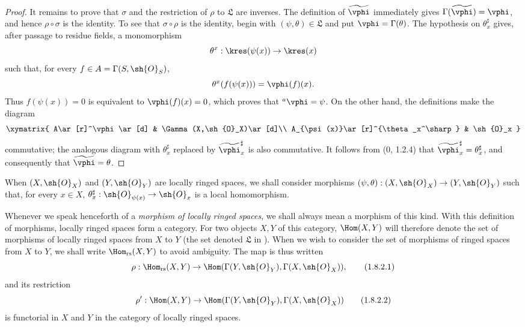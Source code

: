 \begin{proof}
It remains to prove that $\sigma$ and the restriction of $\rho$ to
$\mathfrak{L}$ are inverses.  The definition of
$\widetilde{\vphi}$ immediately gives
$\Gamma(\widetilde{\vphi})=\vphi$, and hence
$\rho\circ\sigma$ is the identity.  To see that $\sigma\circ\rho$ is
the identity, begin with $(\psi,\theta)\in\mathfrak{L}$ and put
$\vphi=\Gamma(\theta)$.  The hypothesis on $\theta_x^\sharp$ gives,
after passage to residue fields, a monomorphism
\[
  \theta^x:\kres(\psi(x))\to\kres(x)
\]
such that, for every $f\in A=\Gamma(S,\sh{O}_S)$,
\[
  \theta^x(f(\psi(x)))=\vphi(f)(x).
\]
Thus $f(\psi(x))=0$ is equivalent to $\vphi(f)(x)=0$, which proves
that ${}^a\vphi=\psi$.  On the other hand, the definitions make the
diagram
\[
  \xymatrix{
    A\ar[r]^\vphi\ar[d] &
    \Gamma(X,\sh{O}_X)\ar[d]\\
    A_{\psi(x)}\ar[r]^{\theta_x^\sharp} &
    \sh{O}_x
  }
\]
commutative; the analogous diagram with $\theta_x^\sharp$ replaced
by $\widetilde{\vphi}_x^\sharp$ is also commutative.  It follows from
(0, 1.2.4) that
$\widetilde{\vphi}_x^\sharp=\theta_x^\sharp$, and consequently that
$\widetilde{\vphi}=\theta$.
\end{proof}

\begin{env}[1.8.2]
\label{ega2:addendum:I.1.8.2}
When $(X,\sh{O}_X)$ and $(Y,\sh{O}_Y)$ are locally ringed spaces, we
shall consider morphisms
$(\psi,\theta):(X,\sh{O}_X)\to(Y,\sh{O}_Y)$ such that, for every
$x\in X$, $\theta_x^\sharp:\sh{O}_{\psi(x)}\to\sh{O}_x$ is a local
homomorphism.

Whenever we speak henceforth of a \emph{morphism of locally ringed
spaces}, we shall always mean a morphism of this kind.  With this
definition of morphisms, locally ringed spaces form a category.  For
two objects $X,Y$ of this category, $\Hom(X,Y)$ will therefore denote
the set of morphisms of locally ringed spaces from $X$ to $Y$ (the set
denoted $\mathfrak{L}$ in ).  When we wish to consider
the set of morphisms of ringed spaces from $X$ to $Y$, we shall write
$\Hom_{\mathrm{rs}}(X,Y)$ to avoid ambiguity.  The map
 is thus written
\begin{equation}
\label{ega2:addendum:I.1.8.2.1}
  \rho:\Hom_{\mathrm{rs}}(X,Y)
  \to\Hom(\Gamma(Y,\sh{O}_Y),\Gamma(X,\sh{O}_X)),
\tag{1.8.2.1}
\end{equation}
and its restriction
\begin{equation}
\label{ega2:addendum:I.1.8.2.2}
  \rho':\Hom(X,Y)
  \to\Hom(\Gamma(Y,\sh{O}_Y),\Gamma(X,\sh{O}_X))
\tag{1.8.2.2}
\end{equation}
is functorial in $X$ and $Y$ in the category of locally ringed spaces.
\end{env}

